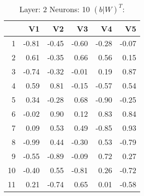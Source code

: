 \begin{table}[ht]
\centering
\begin{tabular}{rrrrrr}
  \hline
 & V1 & V2 & V3 & V4 & V5 \\ 
  \hline
1 & -0.81 & -0.45 & -0.60 & -0.28 & -0.07 \\ 
  2 & 0.61 & -0.35 & 0.66 & 0.56 & 0.15 \\ 
  3 & -0.74 & -0.32 & -0.01 & 0.19 & 0.87 \\ 
  4 & 0.59 & 0.81 & -0.15 & -0.57 & 0.54 \\ 
  5 & 0.34 & -0.28 & 0.68 & -0.90 & -0.25 \\ 
  6 & -0.02 & 0.90 & 0.12 & 0.83 & 0.84 \\ 
  7 & 0.09 & 0.53 & 0.49 & -0.85 & 0.93 \\ 
  8 & -0.99 & 0.44 & -0.30 & 0.53 & -0.79 \\ 
  9 & -0.55 & -0.89 & -0.09 & 0.72 & 0.27 \\ 
  10 & -0.40 & 0.55 & -0.81 & 0.26 & -0.72 \\ 
  11 & 0.21 & -0.74 & 0.65 & 0.01 & -0.58 \\ 
   \hline
\end{tabular}
\caption{Layer: 2 Neurons: 10  $(b|W)^T$: 
} 
\end{table}
